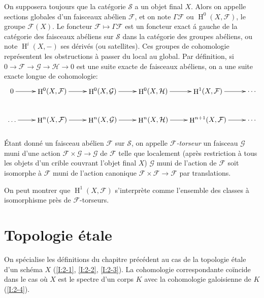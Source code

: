 \documentclass{book}
\DeclareMathOperator{\h}{H}
\newcommand{\cF}{\mathcal{F}}
\newcommand{\cG}{\mathcal{G}}
\newcommand{\cH}{\mathcal{H}}
\newcommand{\sS}{\mathscr{S}}
\begin{document}
On supposera toujours que la catégorie $\sS$ a un objet final $X$. Alors on 
appelle sections globales d'un faisceaux abélien $\cF$, et on note 
$\Gamma\cF$ ou $\h^0(X,\cF)$, le groupe $\cF(X)$. Le foncteur 
$\cF\mapsto\Gamma\cF$ est un foncteur exact \'a gauche de la catégorie des 
faisceaux abéliens sur $\sS$ dans la catégorie des groupes abéliens, ou 
note $\h^i(X,-)$ ses dérivés (ou satellites). Ces groupes de cohomologie 
représentent les obstructions à passer du local au global. Par définition, si 
$0\to\cF\to\cG\to\cH\to 0$ est une suite exacte de faisceaux abéliens, on a une 
suite exacte longue de cohomologie:
\[\xymatrix{
  0 \ar[r] 
    & \h^0(X,\cF) \ar[r] 
    & \h^0(X,\cG) \ar[r] 
    & \h^0(X,\cH) \ar[r] 
    & \h^1(X,\cF) \ar[r] 
    & \cdots \\
  \ldots \ar[r] 
    & \h^n(X,\cF) \ar[r] 
    & \h^n(X,\cG) \ar[r]
    & \h^n(X,\cH) \ar[r] 
    & \h^{n+1}(X,\cF) \ar[r] 
    & \cdots
}\]





\subsubsection{}\label{I:1-6-6}

Étant donné un faisceau abélien $\cF$ sur $\sS$, on appelle 
\emph{$\cF$-torseur} un faisceau $\cG$ muni d'une action $\cF\times\cG\to\cG$ 
de $\cF$ telle que localement (après restriction à tous les objets d'un 
crible couvrant l'objet final $X$) $\cG$ muni de l'action de $\cF$ soit 
isomorphe à $\cF$ muni de l'action canonique $\cF\times \cF\to \cF$ par 
translations. 

On peut montrer que $\h^1(X,\cF)$ s'interprète comme l'ensemble des classes 
à isomorphisme près de $\cF$-torseurs. 




















\section{Topologie étale}\label{I:2}

On spécialise les définitions du chapitre précédent au cas de la 
topologie étale d'un schéma $X$ (\ref{I:2-1}, \ref{I:2-2}, \ref{I:2-3}). La 
cohomologie correspondante coïncide dans le cas où $X$ est le spectre d'un 
corps $K$ avec la cohomologie galoisienne de $K$ (\ref{I:2-4}). 
\end{document}
